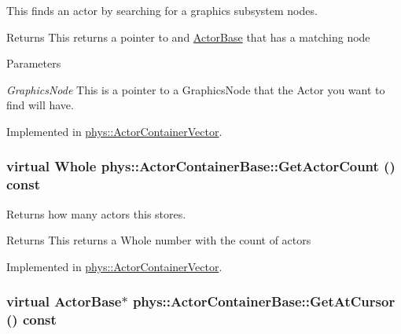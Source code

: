 This finds an actor by searching for a graphics subsystem nodes. 

\begin{DoxyReturn}{Returns}
This returns a pointer to and \hyperlink{classphys_1_1ActorBase}{ActorBase} that has a matching node 
\end{DoxyReturn}

\begin{DoxyParams}{Parameters}
\item[{\em GraphicsNode}]This is a pointer to a GraphicsNode that the Actor you want to find will have. \end{DoxyParams}


Implemented in \hyperlink{classphys_1_1ActorContainerVector_ad01cf1452bda36cee175ae0e54d509cc}{phys::ActorContainerVector}.

\hypertarget{classphys_1_1ActorContainerBase_aa5ec651d4634b2d90efe2a76f9d2fbdd}{
\subsubsection[{GetActorCount}]{\setlength{\rightskip}{0pt plus 5cm}virtual {\bf Whole} phys::ActorContainerBase::GetActorCount () const}}
\label{d1/d00/classphys_1_1ActorContainerBase_aa5ec651d4634b2d90efe2a76f9d2fbdd}


Returns how many actors this stores. 

\begin{DoxyReturn}{Returns}
This returns a Whole number with the count of actors 
\end{DoxyReturn}


Implemented in \hyperlink{classphys_1_1ActorContainerVector_a6d2e5e68e23f5798ad10ba41e479d0f7}{phys::ActorContainerVector}.

\hypertarget{classphys_1_1ActorContainerBase_a2c8fb86a9e188aece105b2a753ccc19a}{
\subsubsection[{GetAtCursor}]{\setlength{\rightskip}{0pt plus 5cm}virtual {\bf ActorBase}$\ast$ phys::ActorContainerBase::GetAtCursor () const}}
\label{d1/d00/classphys_1_1ActorContainerBase_a2c8fb86a9e188aece105b2a753ccc19a}


